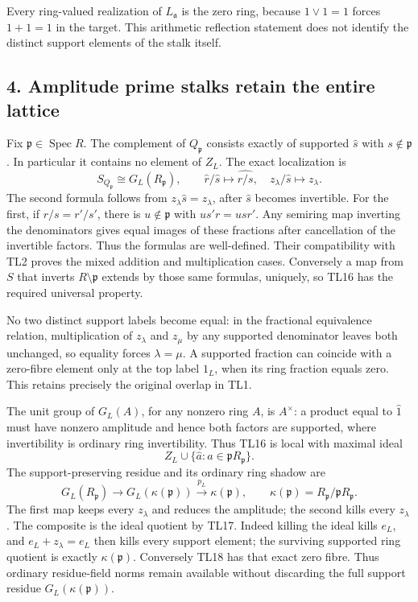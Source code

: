 \documentclass[11pt,a4paper]{article}
\theoremstyle{definition}\newtheorem{definition}[theorem]{Definition}
\begin{document}
Every ring-valued realization of \(L_{\mathfrak a}\) is the zero ring,
because \(1\vee1=1\) forces \(1+1=1\) in the target. This arithmetic
reflection statement does not identify the distinct support elements of
the stalk itself.

\subsection{4. Amplitude prime stalks retain the entire
lattice}\label{amplitude-prime-stalks-retain-the-entire-lattice}

Fix \(\mathfrak p\in\operatorname{Spec}R\). The complement of
\(Q_{\mathfrak p}\) consists exactly of supported \(\widehat s\) with
\(s\notin\mathfrak p\). In particular it contains no element of \(Z_L\).
The exact localization is \[
 \boxed{S_{Q_{\mathfrak p}}\cong G_L(R_{\mathfrak p}),\qquad
 \widehat r/\widehat s\mapsto\widehat{r/s},\quad
 z_\lambda/\widehat s\mapsto z_\lambda.}
 \tag{TL16}
\] The second formula follows from \(z_\lambda\widehat s=z_\lambda\),
after \(\widehat s\) becomes invertible. For the first, if
\(r/s=r'/s'\), there is \(u\notin\mathfrak p\) with \(us'r=usr'\). Any
semiring map inverting the denominators gives equal images of these
fractions after cancellation of the invertible factors. Thus the
formulas are well-defined. Their compatibility with TL2 proves the mixed
addition and multiplication cases. Conversely a map from \(S\) that
inverts \(R\setminus\mathfrak p\) extends by those same formulas,
uniquely, so TL16 has the required universal property.

No two distinct support labels become equal: in the fractional
equivalence relation, multiplication of \(z_\lambda\) and \(z_\mu\) by
any supported denominator leaves both unchanged, so equality forces
\(\lambda=\mu\). A supported fraction can coincide with a zero-fibre
element only at the top label \(1_L\), when its ring fraction equals
zero. This retains precisely the original overlap in TL1.

The unit group of \(G_L(A)\), for any nonzero ring \(A\), is
\(A^\times\): a product equal to \(\widehat1\) must have nonzero
amplitude and hence both factors are supported, where invertibility is
ordinary ring invertibility. Thus TL16 is local with maximal ideal \[
 Z_L\cup\{\widehat a:a\in\mathfrak pR_{\mathfrak p}\}.
 \tag{TL17}
\] The support-preserving residue and its ordinary ring shadow are \[
 G_L(R_{\mathfrak p})\longrightarrow G_L(\kappa(\mathfrak p))
 \xrightarrow{p_L}\kappa(\mathfrak p),
 \qquad\kappa(\mathfrak p)=R_{\mathfrak p}/\mathfrak pR_{\mathfrak p}.
 \tag{TL18}
\] The first map keeps every \(z_\lambda\) and reduces the amplitude;
the second kills every \(z_\lambda\). The composite is the ideal
quotient by TL17. Indeed killing the ideal kills \(e_L\), and
\(e_L+z_\lambda=e_L\) then kills every support element; the surviving
supported ring quotient is exactly \(\kappa(\mathfrak p)\). Conversely
TL18 has that exact zero fibre. Thus ordinary residue-field norms remain
available without discarding the full support residue
\(G_L(\kappa(\mathfrak p))\).
\end{document}
